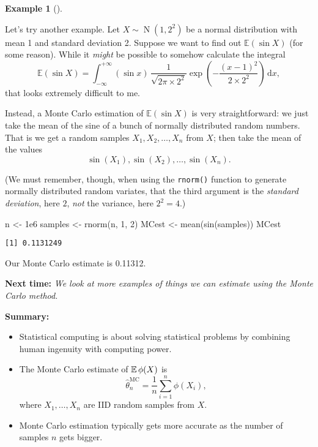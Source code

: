 \documentclass[
  letterpaper,
  DIV=11,
  numbers=noendperiod]{scrreprt}
\newenvironment{Shaded}{\begin{snugshade}}{\end{snugshade}}
\newcommand{\DecValTok}[1]{\textcolor[rgb]{0.68,0.00,0.00}{#1}}
\newcommand{\FloatTok}[1]{\textcolor[rgb]{0.68,0.00,0.00}{#1}}
\newcommand{\FunctionTok}[1]{\textcolor[rgb]{0.28,0.35,0.67}{#1}}
\newcommand{\NormalTok}[1]{\textcolor[rgb]{0.00,0.23,0.31}{#1}}
\newcommand{\OtherTok}[1]{\textcolor[rgb]{0.00,0.23,0.31}{#1}}
\theoremstyle{plain}
\theoremstyle{definition}
\theoremstyle{definition}
\newtheorem{example}{Example}[chapter]
\theoremstyle{remark}
\begin{document}
\begin{example}[]\protect\hypertarget{exm-MC2}{}\label{exm-MC2}

Let's try another example. Let \(X \sim \operatorname{N}(1, 2^2)\) be a
normal distribution with mean 1 and standard deviation 2. Suppose we
want to find out \(\mathbb E(\sin X)\) (for some reason). While it
\emph{might} be possible to somehow calculate the integral
\[ \mathbb E(\sin X) = \int_{-\infty}^{+\infty} (\sin x) \, \frac{1}{\sqrt{2\pi\times 2^2}} \exp\left(-\frac{(x - 1)^2}{2\times 2^2}\right) \, \mathrm{d} x , \]
that looks extremely difficult to me.

Instead, a Monte Carlo estimation of \(\mathbb{E}(\sin X)\) is very
straightforward: we just take the mean of the sine of a bunch of
normally distributed random numbers. That is we get a random samples
\(X_1, X_2, \dots, X_n\) from \(X\); then take the mean of the values
\[\sin(X_1), \sin(X_2), \dots, \sin(X_n) .\]

(We must remember, though, when using the \texttt{rnorm()} function to
generate normally distributed random variates, that the third argument
is the \emph{standard deviation}, here \(2\), \emph{not} the variance,
here \(2^2 = 4\).)

\begin{Shaded}
\begin{Highlighting}[]
\NormalTok{n }\OtherTok{\textless{}{-}} \FloatTok{1e6}
\NormalTok{samples }\OtherTok{\textless{}{-}} \FunctionTok{rnorm}\NormalTok{(n, }\DecValTok{1}\NormalTok{, }\DecValTok{2}\NormalTok{)}
\NormalTok{MCest }\OtherTok{\textless{}{-}} \FunctionTok{mean}\NormalTok{(}\FunctionTok{sin}\NormalTok{(samples))}
\NormalTok{MCest}
\end{Highlighting}
\end{Shaded}

\begin{verbatim}
[1] 0.1131249
\end{verbatim}

Our Monte Carlo estimate is 0.11312.

\end{example}

\textbf{Next time:} \emph{We look at more examples of things we can
estimate using the Monte Carlo method.}

\textbf{Summary:}

\begin{itemize}
\item
  Statistical computing is about solving statistical problems by
  combining human ingenuity with computing power.
\item
  The Monte Carlo estimate of \(\operatorname{\mathbb{E}} \phi(X)\) is
  \[ \widehat{\theta}_n^{\mathrm{MC}} = \frac{1}{n} \sum_{i=1}^n \phi(X_i) , \]
  where \(X_1, \dots, X_n\) are IID random samples from \(X\).
\item
  Monte Carlo estimation typically gets more accurate as the number of
  samples \(n\) gets bigger.
\end{itemize}
\end{document}
